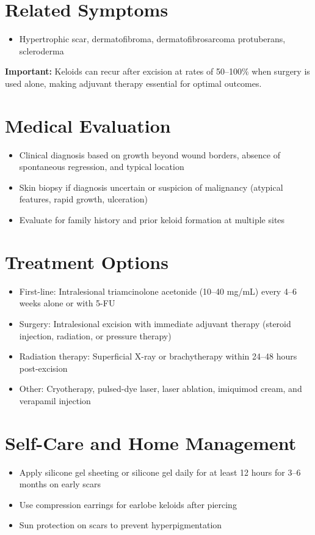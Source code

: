 \section*{Related Symptoms}
\begin{itemize}
  \item Hypertrophic scar, dermatofibroma, dermatofibrosarcoma protuberans, scleroderma
\end{itemize}
\textbf{Important:} Keloids can recur after excision at rates of 50--100\% when surgery is used alone, making adjuvant therapy essential for optimal outcomes.

\section*{Medical Evaluation}
\begin{itemize}
  \item Clinical diagnosis based on growth beyond wound borders, absence of spontaneous regression, and typical location
  \item Skin biopsy if diagnosis uncertain or suspicion of malignancy (atypical features, rapid growth, ulceration)
  \item Evaluate for family history and prior keloid formation at multiple sites
\end{itemize}

\section*{Treatment Options}
\begin{itemize}
  \item First-line: Intralesional triamcinolone acetonide (10--40 mg/mL) every 4--6 weeks alone or with 5-FU
  \item Surgery: Intralesional excision with immediate adjuvant therapy (steroid injection, radiation, or pressure therapy)
  \item Radiation therapy: Superficial X-ray or brachytherapy within 24--48 hours post-excision
  \item Other: Cryotherapy, pulsed-dye laser, laser ablation, imiquimod cream, and verapamil injection
\end{itemize}

\section*{Self-Care and Home Management}
\begin{itemize}
  \item Apply silicone gel sheeting or silicone gel daily for at least 12 hours for 3--6 months on early scars
  \item Use compression earrings for earlobe keloids after piercing
  \item Sun protection on scars to prevent hyperpigmentation
\end{itemize}

